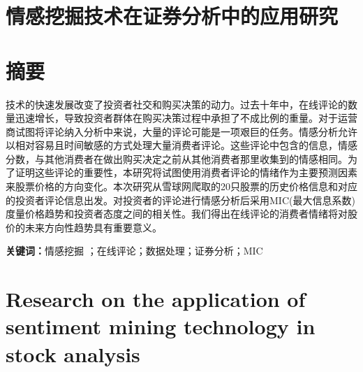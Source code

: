 \section*{ \centering 情感挖掘技术在证券分析中的应用研究}

\noindent
\section*{ \centering \textbf{摘\hspace{1em}要}}

技术的快速发展改变了投资者社交和购买决策的动力。过去十年中，在线评论的数量迅速增长，导致投资者群体在购买决策过程中承担了不成比例的重量。对于运营商试图将评论纳入分析中来说，大量的评论可能是一项艰巨的任务。情感分析允许以相对容易且时间敏感的方式处理大量消费者评论。这些评论中包含的信息，情感分数，与其他消费者在做出购买决定之前从其他消费者那里收集到的情感相同。为了证明这些评论的重要性，本研究将试图使用消费者评论的情绪作为主要预测因素来股票价格的方向变化。本次研究从雪球网爬取的20只股票的历史价格信息和对应的投资者评论信息出发。对投资者的评论进行情感分析后采用MIC(最大信息系数)度量价格趋势和投资者态度之间的相关性。我们得出在线评论的消费者情绪将对股价的未来方向性趋势具有重要意义。

\vspace{0.5cm}
\noindent
\textbf{关键词：}情感挖掘 ；在线评论；数据处理；证券分析；MIC

\clearpage

\section*{\songti{} \centering Research on the application of sentiment mining technology in stock analysis}

